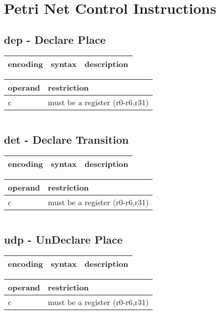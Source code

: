 \documentclass[letterpaper,10pt,openright,twoside,onecolumn]{book}
\begin{document}
\clearpage\section{Petri Net Control Instructions}
\subsection{dep - Declare Place}
  \begin{tabular}{|l|l|l|}
   \hline
    encoding & syntax & description \\
   \hline
   \hline
  \end{tabular}
  \flushleft
  \begin{tabular}{|l|l|}
   \hline
    operand & restriction \\
   \hline
    c & must be a register (r0-r6,r31) \\
   \hline
  \end{tabular}
  \begin{verbatim}
  \end{verbatim}
\newpage\subsection{det - Declare Transition}
  \begin{tabular}{|l|l|l|}
   \hline
    encoding & syntax & description \\
   \hline
   \hline
  \end{tabular}
  \flushleft
  \begin{tabular}{|l|l|}
   \hline
    operand & restriction \\
   \hline
    c & must be a register (r0-r6,r31) \\
   \hline
  \end{tabular}
  \begin{verbatim}
  \end{verbatim}
\newpage\subsection{udp - UnDeclare Place}
  \begin{tabular}{|l|l|l|}
   \hline
    encoding & syntax & description \\
   \hline
   \hline
  \end{tabular}
  \flushleft
  \begin{tabular}{|l|l|}
   \hline
    operand & restriction \\
   \hline
    c & must be a register (r0-r6,r31) \\
   \hline
  \end{tabular}
\end{document}
